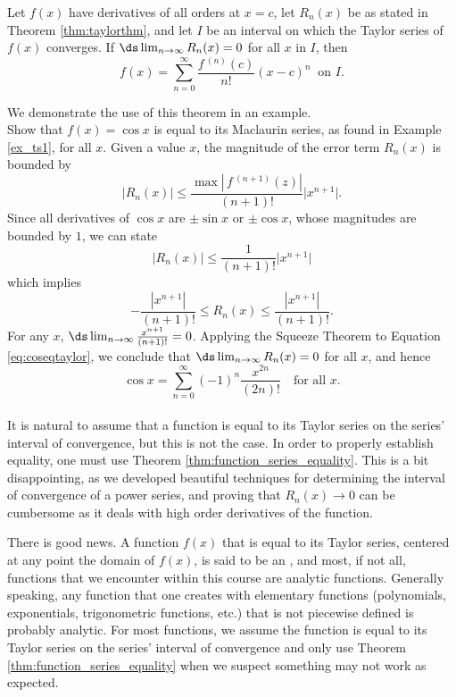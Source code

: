 {Let $f(x)$ have derivatives of all orders at $x=c$, let $R_n(x)$ be as stated in Theorem \ref{thm:taylorthm}, and let $I$ be an interval on which the Taylor series of $f(x)$ converges. 
If $\ds\lim_{n\to\infty} R_n(x) = 0$ for all $x$ in $I$, then 
$$f(x) = \sum_{n=0}^\infty \frac{f\,^{(n)}(c)}{n!}(x-c)^n\ \text{ on $I$.}$$
}

We demonstrate the use of this theorem in an example.\\

{Show that $f(x) = \cos x$ is equal to its Maclaurin series, as found in Example \ref{ex_ts1}, for all $x$. 
}
{Given a value $x$, the magnitude of the error term $R_n(x)$ is bounded by
$$ \big|R_n(x)\big| \leq \frac{\max\left|\,f\,^{(n+1)}(z)\right|}{(n+1)!}\big|x^{n+1}\big|.$$
Since all derivatives of $\cos x$ are $\pm \sin x$ or $\pm\cos x$, whose magnitudes are bounded by $1$, we can state
$$ \big|R_n(x)\big| \leq \frac{1}{(n+1)!}\big|x^{n+1}\big|$$
which implies
\begin{equation}
 -\frac{|x^{n+1}|}{(n+1)!} \leq R_n(x) \leq\frac{|x^{n+1}|}{(n+1)!}.\label{eq:coseqtaylor}
\end{equation}
For any $x$, $\ds\lim_{n\to\infty} \frac{x^{n+1}}{(n+1)!} = 0$. Applying the Squeeze Theorem to Equation \eqref{eq:coseqtaylor}, we conclude that $\ds \lim_{n\to\infty} R_n(x) = 0$ for all $x$, and hence
$$\cos x = \sum_{n=0}^\infty (-1)^{n}\frac{x^{2n}}{(2n)!}\quad \text{for all $x$}.$$
\baselineskip
}\\

It is natural to assume that a function is  equal to its Taylor series on the series' interval of convergence, but this is not the case. In order to properly establish equality, one must use Theorem \ref{thm:function_series_equality}. This is a bit disappointing, as we developed beautiful techniques for determining the interval of convergence of a power series, and proving that $R_n(x)\to 0$ can be cumbersome as it deals with high order derivatives of the function.

There is good news. A function $f(x)$ that is equal to its Taylor series, centered at any point the domain of $f(x)$, is said to be an , and most, if not all, functions that we encounter within this course are analytic functions. Generally speaking, any function that one creates with elementary functions (polynomials, exponentials, trigonometric functions, etc.) that is not piecewise defined is probably analytic. For most functions, we assume the function is equal to its Taylor series on the series' interval of convergence and only use Theorem \ref{thm:function_series_equality} when we suspect something may not work as expected.

